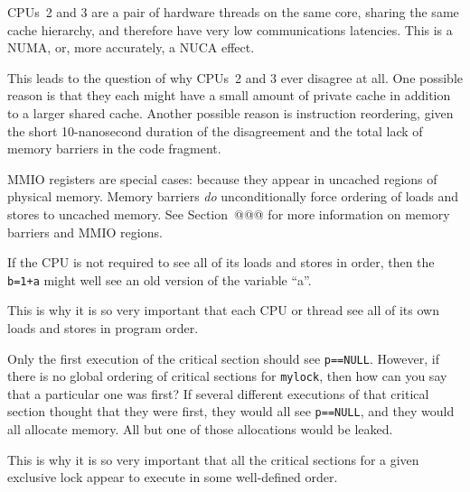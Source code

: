 
	   CPUs~2 and 3 are a pair of hardware threads on the same
	   core, sharing the same cache hierarchy, and therefore have
	   very low communications latencies.
	   This is a NUMA, or, more accurately, a NUCA effect.

	   This leads to the question of why CPUs~2 and 3 ever disagree
	   at all.
	   One possible reason is that they each might have a small amount
	   of private cache in addition to a larger shared cache.
	   Another possible reason is instruction reordering, given the
	   short 10-nanosecond duration of the disagreement and the
	   total lack of memory barriers in the code fragment.


	MMIO registers are special cases: because they appear
	in uncached regions of physical memory.
	Memory barriers \emph{do} unconditionally force ordering
	of loads and stores to uncached memory.
	See Section~@@@ for more information on memory barriers
	and MMIO regions.


	If the CPU is not required to see all of its loads and
	stores in order, then the {\tt b=1+a} might well see an
	old version of the variable ``a''.
	
	This is why it is so very important that each CPU or thread
	see all of its own loads and stores in program order.


	Only the first execution of the critical section should
	see {\tt p==NULL}.
	However, if there is no global ordering of critical sections for
	{\tt mylock}, then how can you say that a particular one was
	first?
	If several different executions of that critical section thought
	that they were first, they would all see {\tt p==NULL}, and
	they would all allocate memory.
	All but one of those allocations would be leaked.
	
	This is why it is so very important that all the critical sections
	for a given exclusive lock appear to execute in some well-defined
	order.

